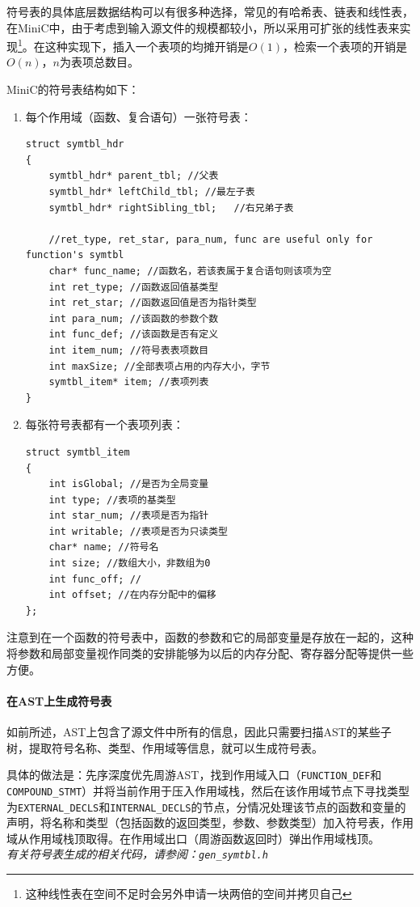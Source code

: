 符号表的具体底层数据结构可以有很多种选择，常见的有哈希表、链表和线性表，在MiniC中，由于考虑到输入源文件的规模都较小，所以采用可扩张的线性表来实现\footnote{这种线性表在空间不足时会另外申请一块两倍的空间并拷贝自己}。在这种实现下，插入一个表项的均摊开销是$O(1)$，检索一个表项的开销是$O(n)$，$n$为表项总数目。


MiniC的符号表结构如下：
\begin{enumerate}
\item 每个作用域（函数、复合语句）一张符号表：
\begin{lstlisting}
struct symtbl_hdr
{
	symtbl_hdr* parent_tbl; //父表
	symtbl_hdr* leftChild_tbl; //最左子表
	symtbl_hdr* rightSibling_tbl;	//右兄弟子表

	//ret_type, ret_star, para_num, func are useful only for function's symtbl
	char* func_name; //函数名，若该表属于复合语句则该项为空
	int ret_type; //函数返回值基类型
	int ret_star; //函数返回值是否为指针类型
	int para_num; //该函数的参数个数
	int func_def; //该函数是否有定义
	int item_num; //符号表表项数目
	int maxSize; //全部表项占用的内存大小，字节
	symtbl_item* item; //表项列表
}
\end{lstlisting}
\item 每张符号表都有一个表项列表：
\begin{lstlisting}
struct symtbl_item
{
	int isGlobal; //是否为全局变量
	int type; //表项的基类型
	int star_num; //表项是否为指针
	int writable; //表项是否为只读类型
	char* name; //符号名 
	int size; //数组大小，非数组为0
	int func_off; //
	int offset; //在内存分配中的偏移
};

\end{lstlisting}
\end{enumerate}
注意到在一个函数的符号表中，函数的参数和它的局部变量是存放在一起的，这种将参数和局部变量视作同类的安排能够为以后的内存分配、寄存器分配等提供一些方便。



\paragraph*{在AST上生成符号表}
如前所述，AST上包含了源文件中所有的信息，因此只需要扫描AST的某些子树，提取符号名称、类型、作用域等信息，就可以生成符号表。

具体的做法是：先序深度优先周游AST，找到作用域入口（\verb|FUNCTION_DEF|和\verb|COMPOUND_STMT|）并将当前作用于压入作用域栈，然后在该作用域节点下寻找类型为\verb|EXTERNAL_DECLS|和\verb|INTERNAL_DECLS|的节点，分情况处理该节点的函数和变量的声明，将名称和类型（包括函数的返回类型，参数、参数类型）加入符号表，作用域从作用域栈顶取得。在作用域出口（周游函数返回时）弹出作用域栈顶。\\
{\it \anchor 有关符号表生成的相关代码，请参阅：\verb|gen_symtbl.h|}\\

